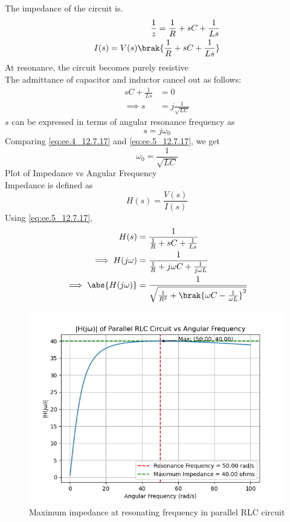 \documentclass[journal,12pt,twocolumn]{IEEEtran}
\theoremstyle{remark}
\begin{document}

The impedance of the circuit is.
 \begin{align}
     \frac{1}{z}=\frac{1}{R}+sC+\frac{1}{Ls}\\
     I(s)=V(s)\brak{\frac{1}{R}+sC+\frac{1}{Ls}}
     \label{eq:ee.2_12.7.17}
 \end{align}
At resonance, the circuit becomes purely resistive\\
The admittance of capacitor and inductor cancel out as follows:
  \begin{align}
    sC + \frac{1}{Ls} &= 0\\
\implies s &= j\frac{1}{\sqrt{LC}}
\label{eq:ee.4_12.7.17}
\end{align}
$s$ can be expressed in terms of angular resonance frequency as
\begin{equation}
    s = j\omega_0 \label{eq:ee.5_12.7.17}
\end{equation}
Comparing \eqref{eq:ee.4_12.7.17} and \eqref{eq:ee.5_12.7.17}, we get
\begin{equation}
    \omega_0 = \frac{1}{\sqrt{LC}}
\end{equation}
Plot of Impedance vs Angular Frequency\\
Impedance is defined as
\begin{equation}
    H(s) = \frac{V(s)}{I(s)}
\end{equation}
Using \eqref{eq:ee.5_12.7.17},
\begin{align}
     H(s) &=\frac{1}{\frac{1}{R} + sC + \frac{1}{Ls}}\\
     \implies H(j\omega) &=\frac{1}{\frac{1}{R} + j\omega C + \frac{1}{j\omega L}}\\
     \implies \abs{H(j\omega)} &= \frac{1}{\sqrt{\frac{1}{R^2} +\brak{\omega C - \frac{1}{\omega L}}^2}}
\end{align}
\begin{figure}[!ht]
    \centering
    \includegraphics[width=1\linewidth]{ncert-physics/12/7/17/figs/m.png}
    \caption{Maximum impedance at resonating frequency in parallel RLC circuit}
\end{figure}
\end{document}
